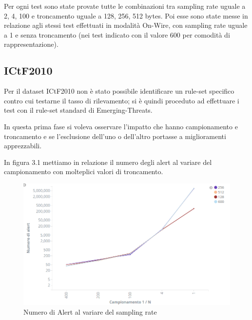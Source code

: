 \documentclass[12pt,a4paper,openright,twoside]{report}
\begin{document}
Per ogni test sono state provate tutte le combinazioni tra sampling rate uguale a
2, 4, 100 e troncamento uguale a 128, 256, 512 bytes.
Poi esse sono state messe in relazione agli stessi test effettuati in modalit\`a On-Wire,
con sampling rate uguale a 1 e senza troncamento (nei test indicato con il valore 600 per comodit\`a di rappresentazione).
\subsection{ICtF2010}

Per il dataset ICtF2010 non \`e stato possibile identificare un rule-set specifico
contro cui testarne il tasso di rilevamento; si \`e quindi proceduto ad effettuare i
test con il rule-set standard di Emerging-Threats.

In questa prima fase si voleva osservare l'impatto che hanno campionamento e troncamento
e se l'esclusione dell'uno o dell'altro portasse a miglioramenti apprezzabili.

In figura 3.1 mettiamo in relazione il numero degli alert al variare del campionamento
con molteplici valori di troncamento.


\begin{figure}[h!]
\begin{center}                          %
  \includegraphics[width=\textwidth]{images/ICTF-samp-vs-trunc.png}
  \caption{Numero di Alert al variare del sampling rate}
  \label{}
\end{center}
\end{figure}
\end{document}
